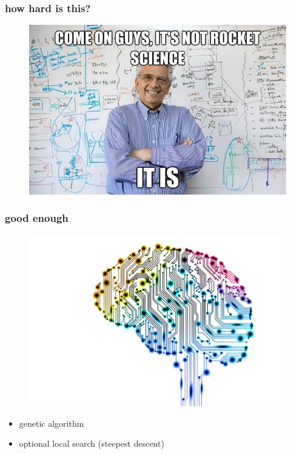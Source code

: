 \documentclass{beamer}
\begin{document}
\begin{frame}
	\frametitle{how hard is this?}

	\begin{figure}
	\centering
	\includegraphics[scale=0.4]{figs/np-complete}
	\end{figure}
	
\end{frame}


\begin{frame}
	\frametitle{good enough}
		\begin{figure}
	\includegraphics[scale=0.1]{figs/ai}
	\end{figure}
	\begin{itemize}
		\item genetic algorithm
		\item optional local search (steepest descent)
	\end{itemize}
	
\end{frame}
\end{document}
